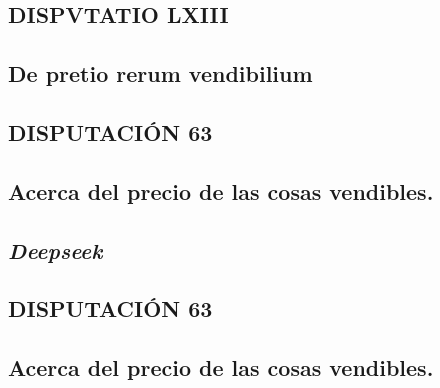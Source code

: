\documentclass{article}
\begin{document}
\begin{paracol}{3} %
  \begin{nthcolumn*}{0} %
    \subsection*{\centering DISPVTATIO LXIII}
    \subsection*{\centering De pretio rerum vendibilium} 
  \end{nthcolumn*}
  \vspace{0.5cm}
  \begin{nthcolumn}{1} %
    \subsection*{\centering DISPUTACIÓN 63}
    \subsection*{\centering Acerca del precio de las cosas vendibles.}
    \subsection*{\centering \emph{Deepseek}}
  \end{nthcolumn}
  \vspace{0.5cm}
  \begin{nthcolumn}{2} %
    \subsection*{\centering DISPUTACIÓN 63}
    \subsection*{\centering Acerca del precio de las cosas vendibles.}

\end{nthcolumn}
\end{paracol}
\end{document}
